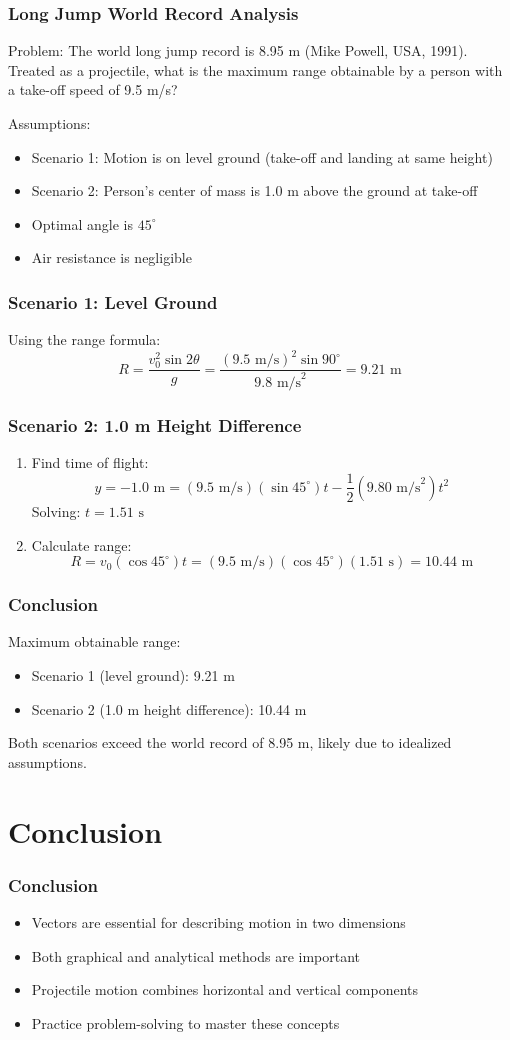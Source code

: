 \documentclass{beamer}
\begin{document}
\begin{frame}
\frametitle{Long Jump World Record Analysis}
Problem: The world long jump record is 8.95 m (Mike Powell, USA, 1991). Treated as a projectile, what is the maximum range obtainable by a person with a take-off speed of 9.5 m/s?

Assumptions:
\begin{itemize}
\item Scenario 1: Motion is on level ground (take-off and landing at same height)
\item Scenario 2: Person's center of mass is 1.0 m above the ground at take-off
\item Optimal angle is $45^\circ$
\item Air resistance is negligible
\end{itemize}
\end{frame}

\begin{frame}
\frametitle{Scenario 1: Level Ground}
Using the range formula:
\[
R = \frac{v_0^2 \sin 2\theta}{g} = \frac{(9.5 \text{ m/s})^2 \sin 90^\circ}{9.8 \text{ m/s}^2} = 9.21 \text{ m}
\]
\end{frame}

\begin{frame}
\frametitle{Scenario 2: 1.0 m Height Difference}
\begin{enumerate}
\item Find time of flight:
\[
y = -1.0 \text{ m} = (9.5 \text{ m/s})(\sin 45^\circ)t - \frac{1}{2}(9.80 \text{ m/s}^2)t^2
\]
Solving: $t = 1.51 \text{ s}$
\item Calculate range:
\[
R = v_0 (\cos 45^\circ) t = (9.5 \text{ m/s})(\cos 45^\circ)(1.51 \text{ s}) = 10.44 \text{ m}
\]
\end{enumerate}
\end{frame}

\begin{frame}
\frametitle{Conclusion}
Maximum obtainable range:
\begin{itemize}
\item Scenario 1 (level ground): 9.21 m
\item Scenario 2 (1.0 m height difference): 10.44 m
\end{itemize}
Both scenarios exceed the world record of 8.95 m, likely due to idealized assumptions.
\end{frame}
\section{Conclusion}

\begin{frame}
\frametitle{Conclusion}
\begin{itemize}[<+->]
\item Vectors are essential for describing motion in two dimensions
\item Both graphical and analytical methods are important
\item Projectile motion combines horizontal and vertical components
\item Practice problem-solving to master these concepts
\end{itemize}
\end{frame}
\end{document}
